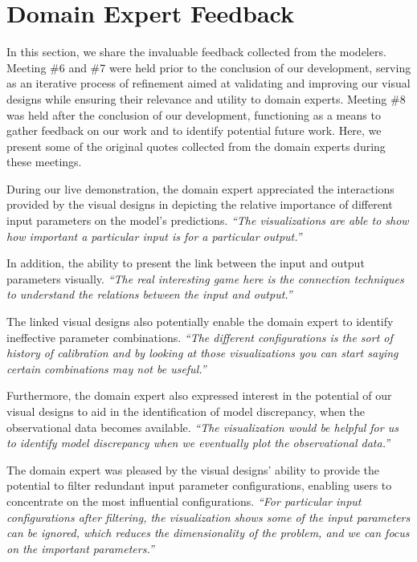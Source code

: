 \section{Domain Expert Feedback}
\label{sec:feedback}
In this section, we share the invaluable feedback collected from the modelers. 
Meeting \#6 and \#7 were held prior to the conclusion of our development, serving as an iterative process of refinement aimed at validating and improving our visual designs while ensuring their relevance and utility to domain experts.
Meeting \#8 was held after the conclusion of our development, functioning as a means to gather feedback on our work and to identify potential future work.
Here, we present some of the original quotes collected from the domain experts during these meetings.


During our live demonstration, the domain expert appreciated the interactions provided by the visual designs in depicting the relative importance of different input parameters on the model's predictions.
\textit{``The visualizations are able to show how important a particular input is for a particular output.''
    }

In addition, the ability to present the link between the input and output parameters visually.
\textit{``The real interesting game here is the connection techniques to understand the relations between the input and output.''
}

The linked visual designs also potentially enable the domain expert to identify ineffective parameter combinations.
\textit{``The different configurations is the sort of history of calibration and by looking at those visualizations you can start saying certain combinations may not be useful.''
}

Furthermore, the domain expert also expressed interest in the potential of our visual designs to aid in the identification of model discrepancy, when the observational data becomes available.
\textit{``The visualization would be helpful for us to identify model discrepancy when we eventually plot the observational data.''
}


The domain expert was pleased by the visual designs' ability to provide the potential to filter redundant input parameter configurations, enabling users to concentrate on the most influential configurations.
\textit{``For particular input configurations after filtering, the visualization shows some of the input parameters can be ignored, which reduces the dimensionality of the problem, and we can focus on the important parameters.''
}

